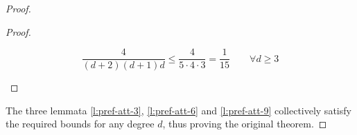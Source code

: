 \begin{proof}
\begin{proof}
\begin{itemize}
{                \[
                    \frac{4}{(d + 2)(d + 1)d} \leq \frac{4}{5 \cdot 4 \cdot 3} = \frac{1}{15} \qquad \forall d \geq 3
                \]

            }


        \end{itemize}
        
    \end{proof}

    The three lemmata \ref{l:pref-att-3}, \ref{l:pref-att-6} and \ref{l:pref-att-9} collectively satisfy the required bounds for any degree $d$, thus proving the original theorem.

\end{proof}
